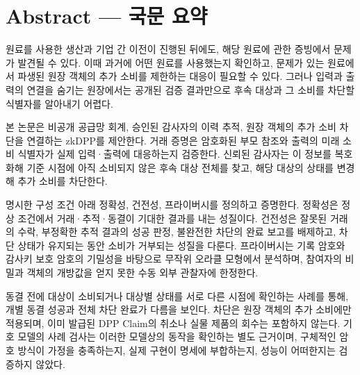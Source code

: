 \section*{Abstract — 국문 요약}
원료를 사용한 생산과 기업 간 이전이 진행된 뒤에도, 해당 원료에 관한 증빙에서 문제가 발견될 수 있다.
이때 과거에 어떤 원료를 사용했는지 확인하고, 문제가 있는 원료에서 파생된 원장 객체의 추가 소비를 제한하는 대응이 필요할 수 있다.
그러나 입력과 출력의 연결을 숨기는 원장에서는 공개된 검증 결과만으로 후속 대상과 그 소비를 차단할 식별자를 알아내기 어렵다.

본 논문은 비공개 공급망 회계, 승인된 감사자의 이력 추적, 원장 객체의 추가 소비 차단을 연결하는 zkDPP를 제안한다.
거래 증명은 암호화된 부모 참조와 출력의 미래 소비 식별자가 실제 입력·출력에 대응하는지 검증한다.
신뢰된 감사자는 이 정보를 복호화해 기준 시점에 아직 소비되지 않은 후속 대상 전체를 찾고, 해당 대상의 상태를 변경해 추가 소비를 차단한다.

명시한 구성 조건 아래 정확성, 건전성, 프라이버시를 정의하고 증명한다.
정확성은 정상 조건에서 거래·추적·동결이 기대한 결과를 내는 성질이다.
건전성은 잘못된 거래의 수락, 부정확한 추적 결과의 성공 판정, 불완전한 차단의 완료 보고를 배제하고, 차단 상태가 유지되는 동안 소비가 거부되는 성질을 다룬다.
프라이버시는 기록 암호와 감사키 보호 암호의 기밀성을 바탕으로 무작위 오라클 모형에서 분석하며, 참여자의 비밀과 객체의 개방값을 얻지 못한 수동 외부 관찰자에 한정한다.

동결 전에 대상이 소비되거나 대상별 상태를 서로 다른 시점에 확인하는 사례를 통해, 개별 동결 성공과 전체 차단 완료가 다름을 보인다.
차단은 원장 객체의 추가 소비에만 적용되며, 이미 발급된 DPP Claim의 취소나 실물 제품의 회수는 포함하지 않는다.
기호 모델의 사례 검사는 이러한 모델상의 동작을 확인하는 별도 근거이며, 구체적인 암호 방식이 가정을 충족하는지, 실제 구현이 명세에 부합하는지, 성능이 어떠한지는 검증하지 않았다.
